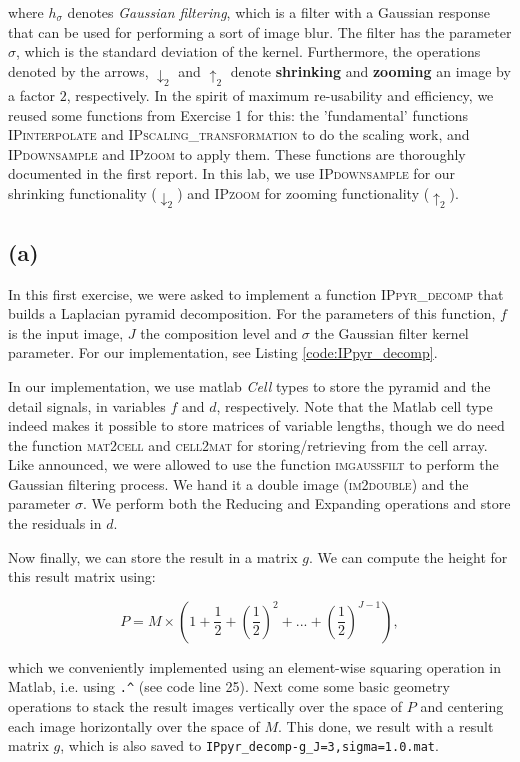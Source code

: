 \documentclass{article}
\begin{document}
where $h_\sigma$ denotes \textit{Gaussian filtering}, which is a filter with a Gaussian response that can be used for performing a sort of image blur. The filter has the parameter $\sigma$, which is the standard deviation of the kernel. Furthermore, the operations denoted by the arrows, $\downarrow_2$ and $\uparrow_2$ denote \textbf{shrinking} and \textbf{zooming} an image by a factor $2$, respectively. In the spirit of maximum re-usability and efficiency, we reused some functions from Exercise 1 for this: the 'fundamental' functions \textsc{IPinterpolate} and \textsc{IPscaling\_transformation} to do the scaling work, and \textsc{IPdownsample} and \textsc{IPzoom} to apply them. These functions are thoroughly documented in the first report. In this lab, we use \textsc{IPdownsample} for our shrinking functionality ($\downarrow_2$) and \textsc{IPzoom} for zooming functionality ($\uparrow_2$).

\subsection*{(a)} In this first exercise, we were asked to implement a function \textsc{IPpyr\_decomp} that builds a Laplacian pyramid decomposition. For the parameters of this function, $f$ is the input image, $J$ the composition level and $\sigma$ the Gaussian filter kernel parameter. For our implementation, see  Listing \ref{code:IPpyr_decomp}.

In our implementation, we use matlab \textit{Cell} types to store the pyramid and the detail signals, in variables $f$ and $d$, respectively. Note that the Matlab cell type indeed makes it possible to store matrices of variable lengths, though we do need the function \textsc{mat2cell} and \textsc{cell2mat} for storing/retrieving from the cell array. Like announced, we were allowed to use the function \textsc{imgaussfilt} to perform the Gaussian filtering process. We hand it a double image (\textsc{im2double}) and the parameter $\sigma$. We perform both the Reducing and Expanding operations and store the residuals in $d$.

Now finally, we can store the result in a matrix $g$. We can compute the height for this result matrix using:


\[
    P = M \times (1+\frac{1}{2}+(\frac{1}{2})^2+...+(\frac{1}{2})^{J-1}),
\]

which we conveniently implemented using an element-wise squaring operation in Matlab, i.e. using \texttt{.\^} (see code line 25). Next come some basic geometry operations to stack the result images vertically over the space of $P$ and centering each image horizontally over the space of $M$. This done, we result with a result matrix $g$, which  is also saved to \texttt{IPpyr\_decomp-g\_J=3,sigma=1.0.mat}.
\end{document}
